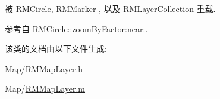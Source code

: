 被 \hyperlink{interface_r_m_circle_ad1cd9f88068ff39d6000f2bf9816cc2b}{R\-M\-Circle}, \hyperlink{interface_r_m_marker_ad98fa242aceef563743c13963d8a79ca}{R\-M\-Marker} , 以及 \hyperlink{interface_r_m_layer_collection_ade8dc9cb544571522ee47b35e124ac8e}{R\-M\-Layer\-Collection} 重载.



参考自 R\-M\-Circle\-::zoom\-By\-Factor\-:near\-:.



该类的文档由以下文件生成\-:\begin{DoxyCompactItemize}
\item 
Map/\hyperlink{_r_m_map_layer_8h}{R\-M\-Map\-Layer.\-h}\item 
Map/\hyperlink{_r_m_map_layer_8m}{R\-M\-Map\-Layer.\-m}\end{DoxyCompactItemize}
